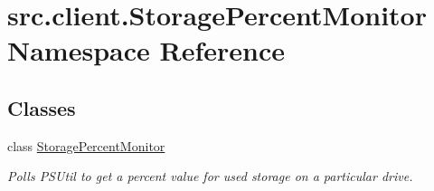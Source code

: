 \hypertarget{namespacesrc_1_1client_1_1_storage_percent_monitor}{\section{src.\-client.\-Storage\-Percent\-Monitor Namespace Reference}
\label{namespacesrc_1_1client_1_1_storage_percent_monitor}
}
\subsection*{Classes}
\begin{DoxyCompactItemize}
\item 
class \hyperlink{classsrc_1_1client_1_1_storage_percent_monitor_1_1_storage_percent_monitor}{Storage\-Percent\-Monitor}
\begin{DoxyCompactList}\small\item\em Polls P\-S\-Util to get a percent value for used storage on a particular drive. \end{DoxyCompactList}\end{DoxyCompactItemize}
